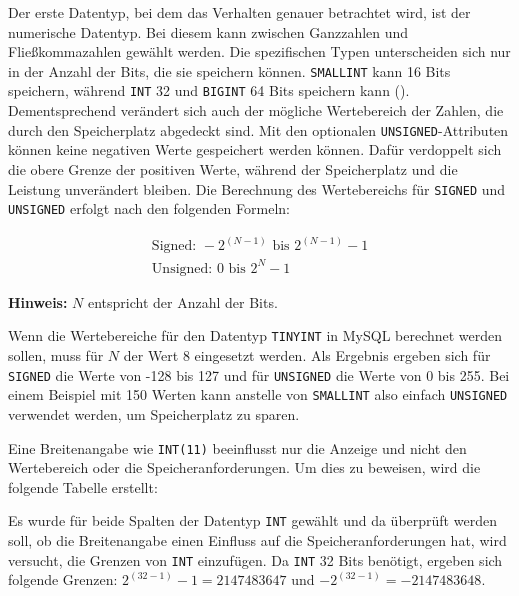 Der erste Datentyp, bei dem das Verhalten genauer betrachtet wird, ist der numerische Datentyp.
Bei diesem kann zwischen Ganzzahlen und Fließkommazahlen gewählt werden.
Die spezifischen Typen unterscheiden sich nur in der Anzahl der Bits, die sie speichern können.
\texttt{SMALLINT} kann 16 Bits speichern, während \texttt{INT} 32 und \texttt{BIGINT} 64 Bits speichern kann (\cite{mysql_data_types_numeric}).
Dementsprechend verändert sich auch der mögliche Wertebereich der Zahlen, die durch den Speicherplatz abgedeckt sind.
Mit den optionalen \texttt{UNSIGNED}-Attributen können keine negativen Werte gespeichert werden können.
Dafür verdoppelt sich die obere Grenze der positiven Werte, während der Speicherplatz und die Leistung unverändert bleiben.
Die Berechnung des Wertebereichs für \texttt{SIGNED} und \texttt{UNSIGNED} erfolgt nach den folgenden Formeln:

\vspace{-27pt}
\begin{gather}
    \text{Signed: } -2^{(N-1)} \text{ bis } 2^{(N-1)} - 1\label{eq:equation-signed} \\
    \text{Unsigned: } 0 \text{ bis } 2^N - 1\label{eq:equation-unsigned}
\end{gather}

\vspace{-10pt}
\textbf{Hinweis:} $N$ entspricht der Anzahl der Bits.

Wenn die Wertebereiche für den Datentyp \texttt{TINYINT} in MySQL berechnet werden sollen, muss für $N$ der Wert 8 eingesetzt werden.
Als Ergebnis ergeben sich für \texttt{SIGNED} die Werte von -128 bis 127 und für \texttt{UNSIGNED} die Werte von 0 bis 255.
Bei einem Beispiel mit 150 Werten kann anstelle von \texttt{SMALLINT} also einfach \texttt{UNSIGNED} verwendet werden, um Speicherplatz zu sparen.

Eine Breitenangabe wie \texttt{INT(11)} beeinflusst nur die Anzeige und nicht den Wertebereich oder die Speicheranforderungen.
Um dies zu beweisen, wird die folgende Tabelle erstellt:


\vspace{-7pt}

Es wurde für beide Spalten der Datentyp \texttt{INT} gewählt und da überprüft werden soll, ob die Breitenangabe einen Einfluss auf die Speicheranforderungen hat, wird versucht, die Grenzen von \texttt{INT} einzufügen.
Da \texttt{INT} 32 Bits benötigt, ergeben sich folgende Grenzen: $2^{(32-1)} - 1 = 2147483647$ und $-2^{(32-1)} = -2147483648$.

